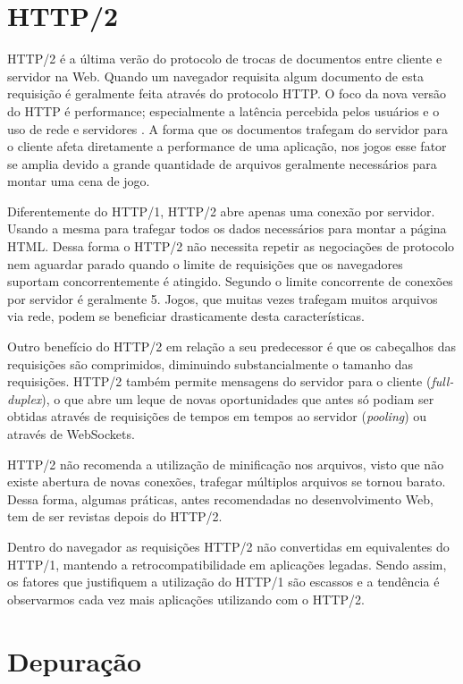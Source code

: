 \section{HTTP/2}
HTTP/2 é a última verão do protocolo de trocas de documentos entre
cliente e servidor na Web. Quando um navegador requisita algum documento
de esta requisição é geralmente feita através do protocolo HTTP. O
foco da nova versão do HTTP é performance; especialmente a latência
percebida pelos usuários e o uso de rede e servidores \autocite{http2}.
A forma que os documentos trafegam do servidor para o cliente afeta
diretamente a performance de uma aplicação, nos jogos esse fator se
amplia devido a grande quantidade de arquivos geralmente necessários
para montar uma cena de jogo.

Diferentemente do HTTP/1, HTTP/2 abre apenas uma conexão por servidor.
Usando a mesma para trafegar todos os dados necessários para montar
a página HTML. Dessa forma o HTTP/2 não necessita repetir as
negociações de protocolo nem aguardar parado quando o limite de
requisições que os navegadores suportam concorrentemente é atingido.
Segundo \citet{gameAssetManagement} o limite concorrente de conexões
por servidor é geralmente 5. Jogos, que muitas vezes trafegam
muitos arquivos via rede, podem se beneficiar drasticamente desta
características.

Outro benefício do HTTP/2 em relação a seu predecessor é que
os cabeçalhos das requisições são comprimidos, diminuindo
substancialmente o tamanho das requisições. HTTP/2 também permite
mensagens do servidor para o cliente (\textit{full-duplex}), o
que abre um leque de novas oportunidades que antes só podiam ser
obtidas através de requisições de tempos em tempos ao servidor
(\textit{pooling}) ou através de WebSockets.

HTTP/2 não recomenda a utilização de minificação nos arquivos,
visto que não existe abertura de novas conexões, trafegar múltiplos
arquivos se tornou barato. Dessa forma, algumas práticas, antes
recomendadas no desenvolvimento Web, tem de ser revistas depois do
HTTP/2.

Dentro do navegador as requisições HTTP/2 não convertidas em
equivalentes do HTTP/1, mantendo a retrocompatibilidade em aplicações
legadas. Sendo assim, os fatores que justifiquem a utilização do HTTP/1
são escassos e a tendência é observarmos cada vez mais aplicações
utilizando com o HTTP/2.

\section{Depuração}


